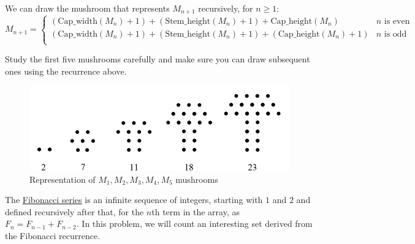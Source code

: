 \documentclass[addpoints]{exam}
\begin{document}
\begin{questions}
We can draw the mushroom that represents $M_{n+1}$ recursively, for $n \geq 1$:
\[ 
    M_{n+1}=
    \begin{cases} 
      (\textrm{Cap\_width}(M_n) + 1) + (\textrm{Stem\_height}(M_n) + 1) + \textrm{Cap\_height}(M_n)  & n \textrm{ is even} \\
      (\textrm{Cap\_width}(M_n) + 1) + (\textrm{Stem\_height}(M_n) + 1)  + (\textrm{Cap\_height}(M_n)+1) & n \textrm{ is odd}  \\      
   \end{cases}
\]

Study the first five mushrooms carefully and make sure you can draw subsequent ones using the recurrence above.

\begin{figure}[h]
  \centering
  \includegraphics{mushroom_series.png}
  \caption{Representation of $M_1,M_2,M_3,M_4,M_5$ mushrooms}
  \label{fig:mushroom_anatomy}
\end{figure}


\question
    The \href{https://en.wikipedia.org/wiki/Fibonacci_number}{Fibonacci series} is an infinite sequence of integers, starting with $1$ and $2$ and defined recursively after that, for the $n$th term in the array, as $F_n = F_{n-1} + F_{n-2}$. In this problem, we will count an interesting set derived from the Fibonacci recurrence.
    

\end{questions}
\end{document}
